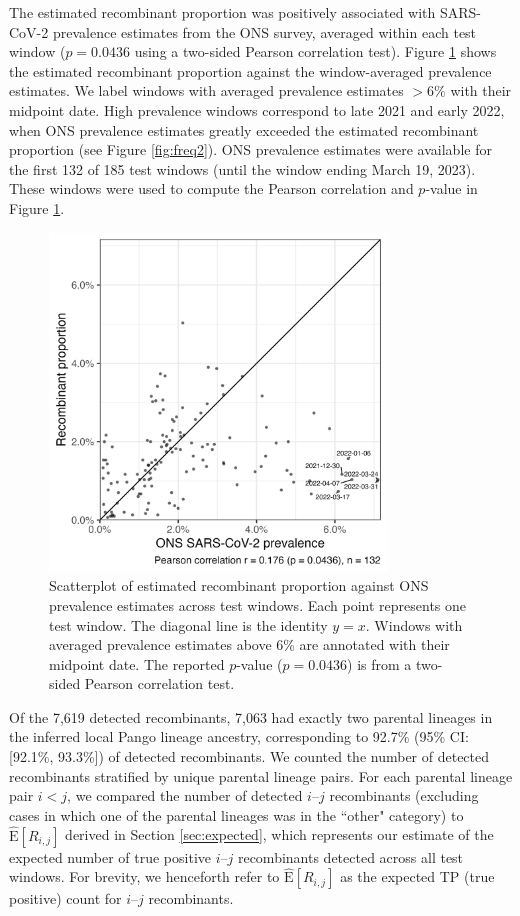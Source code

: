\documentclass[11pt,oneside,letterpaper]{article}
\begin{document}
The estimated recombinant proportion was positively associated with SARS-CoV-2 prevalence estimates from the ONS survey, averaged within each test window ($p=0.0436$ using a two-sided Pearson correlation test). Figure \ref{fig:scatter} shows the estimated recombinant proportion against the window-averaged prevalence estimates. We label windows with averaged prevalence estimates $>6\%$ with their midpoint date. High prevalence windows correspond to late 2021 and early 2022, when ONS prevalence estimates greatly exceeded the estimated recombinant proportion (see Figure \ref{fig:freq2}). ONS prevalence estimates were available for the first 132 of 185 test windows (until the window ending March 19, 2023). These windows were used to compute the Pearson correlation and $p$-value in Figure \ref{fig:scatter}.

\begin{figure}[H]
\centering
\includegraphics[width=0.8\textwidth]{figures/hmm/scatter_prop_vs_ons.png}
\caption[Scatter: recombinant proportion vs ONS prevalence]{Scatterplot of estimated recombinant proportion against ONS prevalence estimates across test windows. Each point represents one test window. The diagonal line is the identity $y=x$. Windows with averaged prevalence estimates above 6\% are annotated with their midpoint date. The reported $p$-value ($p=0.0436$) is from a two-sided Pearson correlation test.}
\label{fig:scatter}
\end{figure}

Of the 7,619 detected recombinants, 7,063 had exactly two parental lineages in the inferred local Pango lineage ancestry, corresponding to 92.7\% (95\% CI: [92.1\%, 93.3\%]) of detected recombinants. We counted the number of detected recombinants stratified by unique parental lineage pairs. For each parental lineage pair $i<j$, we compared the number of detected $i\text{--}j$ recombinants  (excluding cases in which one of the parental lineages was in the ``other" category) to $\hat{\mathrm{E}}[R_{i,j}]$ derived in Section \ref{sec:expected}, which represents our estimate of the expected number of true positive $i\text{--}j$ recombinants detected across all test windows. For brevity, we henceforth refer to $\hat{\mathrm{E}}[R_{i,j}]$ as the expected TP (true positive) count for $i\text{--}j$ recombinants.
\end{document}
